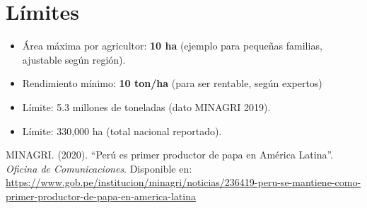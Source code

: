 \documentclass{article}
\begin{document}
\section{Límites}
\begin{itemize}
    \item Área máxima por agricultor: \textbf{10 ha} (ejemplo para pequeñas familias, ajustable según región).
    \item Rendimiento mínimo: \textbf{10 ton/ha} (para ser rentable, según expertos)
    \item Límite: 5.3 millones de toneladas (dato MINAGRI 2019).
    \item Límite: 330,000 ha (total nacional reportado).
\end{itemize}

\begin{thebibliography}{9}
MINAGRI. (2020). ``Perú es primer productor de papa en América Latina''. \\
\emph{Oficina de Comunicaciones}. Disponible en: \\
\url{https://www.gob.pe/institucion/minagri/noticias/236419-peru-se-mantiene-como-primer-productor-de-papa-en-america-latina}
\end{thebibliography}
\end{document}
